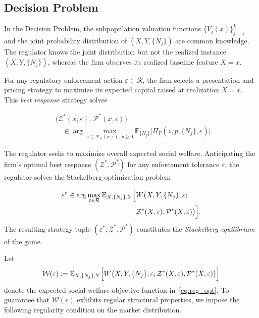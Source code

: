\subsection{Decision Problem}

In the Decision Problem, the subpopulation valuation functions $\{V_j(x)\}_{j=1}^k$ and the joint probability distribution of $(X, Y, \{N_j\})$ are common knowledge. The regulator knows the joint distribution but not the realized instance $(X, Y, \{N_j\})$, whereas the firm observes its realized baseline feature $X=x$.

For any regulatory enforcement action $\varepsilon \in \mathcal{R}$, the firm selects a presentation and pricing strategy to maximize its expected capital raised at realization $X=x$. This \emph{best response} strategy solves

\begin{equation}
\label{eq:firm_br}
\begin{aligned}
&\bigl(\mathcal{Z}^*(x, \varepsilon),\, \mathcal{P}^*(x, \varepsilon)\bigr) \\
&\quad \in \arg\max_{z \in \mathcal{F}_Z(x, \varepsilon),\, p \ge 0} \mathbb{E}_{\{N_j\}}\bigl[\Pi_F(z, p, \{N_j\}, \varepsilon)\bigr].
\end{aligned}
\end{equation}

The regulator seeks to maximize overall expected social welfare. Anticipating the firm's optimal best response $(\mathcal{Z}^*, \mathcal{P}^*)$ for any enforcement tolerance $\varepsilon$, the regulator solves the Stackelberg optimization problem

\begin{equation}
\label{eq:reg_opt}
\begin{aligned}
\varepsilon^* \in \arg\max_{\varepsilon \in \mathcal{R}} \mathbb{E}_{X,\{N_j\},Y}\Bigl[ &W\bigl(X, Y, \{N_j\}, \varepsilon; \\
&\mathcal{Z}^*(X, \varepsilon), \mathcal{P}^*(X, \varepsilon)\bigr)\Bigr].
\end{aligned}
\end{equation}
The resulting strategy tuple $(\varepsilon^*, \mathcal{Z}^*, \mathcal{P}^*)$ constitutes the \emph{Stackelberg equilibrium} of the game.

Let
\begin{equation}
\mathcal{W}(\varepsilon) := \mathbb{E}_{X,\{N_j\},Y}\Bigl[ W\bigl(X, Y, \{N_j\}, \varepsilon; \mathcal{Z}^*(X, \varepsilon), \mathcal{P}^*(X, \varepsilon)\bigr) \Bigr]
\end{equation}
denote the expected social welfare objective function in~\eqref{eq:reg_opt}. To guarantee that $\mathcal{W}(\varepsilon)$ exhibits regular structural properties, we impose the following regularity condition on the market distribution.


